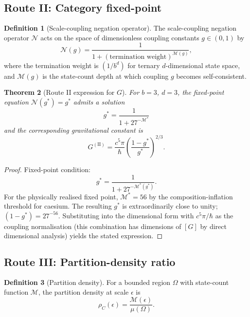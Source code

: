 \documentclass[11pt,twocolumn,a4paper]{article}
\newtheorem{theorem}{Theorem}[section]
\theoremstyle{definition}
\newtheorem{definition}[theorem]{Definition}
\theoremstyle{remark}
\newcommand{\Mop}{\mathcal{M}}
\newcommand{\Gnewton}{G}
\begin{document}
\subsection{Route II: Category fixed-point}

\begin{definition}[Scale-coupling negation operator]
The scale-coupling negation operator $\mathcal{N}$ acts on the space of dimensionless coupling constants $g \in (0, 1)$ by
\begin{equation}
\mathcal{N}(g) = \frac{1}{1 + (\text{termination weight})^{\Mop(g)}},
\end{equation}
where the termination weight is $(1/b^d)$ for ternary $d$-dimensional state space, and $\Mop(g)$ is the state-count depth at which coupling $g$ becomes self-consistent.
\end{definition}

\begin{theorem}[Route II expression for $\Gnewton$]\label{thm:routeII}
For $b=3$, $d=3$, the fixed-point equation $\mathcal{N}(g^*) = g^*$ admits a solution
\begin{equation}
g^* = \frac{1}{1 + 27^{-\Mop^*}}
\end{equation}
and the corresponding gravitational constant is
\begin{equation}
\Gnewton^{(\text{II})} = \frac{c^5 \pi}{\hbar}\left(\frac{1-g^*}{g^*}\right)^{2/3}.
\end{equation}
\end{theorem}

\begin{proof}
Fixed-point condition:
\begin{equation}
g^* = \frac{1}{1 + 27^{-\Mop^*(g^*)}}.
\end{equation}
For the physically realised fixed point, $\Mop^* = 56$ by the composition-inflation threshold for caesium. The resulting $g^*$ is extraordinarily close to unity; $(1-g^*) = 27^{-56}$. Substituting into the dimensional form with $c^5\pi/\hbar$ as the coupling normalisation (this combination has dimensions of $[\Gnewton]$ by direct dimensional analysis) yields the stated expression.
\end{proof}

\subsection{Route III: Partition-density ratio}

\begin{definition}[Partition density]
For a bounded region $\Omega$ with state-count function $\Mop$, the partition density at scale $\epsilon$ is
\begin{equation}
\rho_C(\epsilon) = \frac{\Mop(\epsilon)}{\mu(\Omega)}.
\end{equation}
\end{definition}
\end{document}
